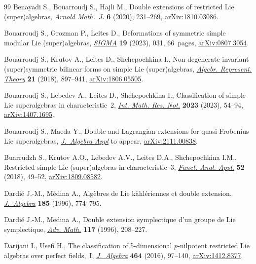 \documentclass[pdftex]{sigma}
\numberwithin{equation}{section}
\begin{document}
\begin{thebibliography}{99}
Benayadi S., Bouarroudj S., Hajli M., Double extensions of restricted {L}ie
 (super)algebras, \href{https://doi.org/10.1007/s40598-020-00149-5}{\textit{Arnold Math.~J.}} \textbf{6} (2020), 231--269,
 \href{https://arxiv.org/abs/1810.03086}{arXiv:1810.03086}.

Bouarroudj S., Grozman P., Leites D., Deformations of symmetric simple modular
 {L}ie (super)algebras, \href{https://doi.org/10.3842/SIGMA.2023.031}{\textit{SIGMA}} \textbf{19} (2023), 031, 66~pages,
 \href{https://arxiv.org/abs/0807.3054}{arXiv:0807.3054}.

Bouarroudj S., Krutov A., Leites D., Shchepochkina I., Non-degenerate invariant
 (super)symmetric bilinear forms on simple {L}ie (super)algebras,
 \href{https://doi.org/10.1007/s10468-018-9802-8}{\textit{Algebr. Represent. Theory}} \textbf{21} (2018), 897--941,
 \href{https://arxiv.org/abs/1806.05505}{arXiv:1806.05505}.

Bouarroudj S., Lebedev A., Leites D., Shchepochkina I., Classification of
 simple {L}ie superalgebras in characteristic~2, \href{https://doi.org/10.1093/imrn/rnab265}{\textit{Int. Math. Res. Not.}}
 \textbf{2023} (2023), 54--94, \href{https://arxiv.org/abs/1407.1695}{arXiv:1407.1695}.

Bouarroudj S., Maeda Y., Double and {L}agrangian extensions for
 quasi-{F}robenius {L}ie superalgebras, \href{https://doi.org/10.1142/S0219498824500014}{\textit{J.~Algebra Appl}} {t}o appear,
 \href{https://arxiv.org/abs/2111.00838}{arXiv:2111.00838}.

Buarrudzh S., Krutov A.O., Lebedev A.V., Leites D.A., Shchepochkina I.M.,
 Restricted simple {L}ie (super)algebras in characteristic~3, \href{https://doi.org/10.1007/s10688-018-0206-7}{\textit{Funct.
 Anal. Appl.}} \textbf{52} (2018), 49--52, \href{https://arxiv.org/abs/1809.08582}{arXiv:1809.08582}.

Dardi\'e J.-M., M\'edina A., Alg\`ebres de {L}ie k\"ahl\'eriennes et double
 extension, \href{https://doi.org/10.1006/jabr.1996.0350}{\textit{J.~Algebra}} \textbf{185} (1996), 774--795.

Dardi\'e J.-M., Medina A., Double extension symplectique d'un groupe de {L}ie
 symplectique, \href{https://doi.org/10.1006/aima.1996.0009}{\textit{Adv. Math.}} \textbf{117} (1996), 208--227.

Darijani I., Usefi H., The classification of 5-dimensional {$p$}-nilpotent
 restricted {L}ie algebras over perfect fields,~{I}, \href{https://doi.org/10.1016/j.jalgebra.2016.06.011}{\textit{J.~Algebra}}
 \textbf{464} (2016), 97--140, \href{https://arxiv.org/abs/1412.8377}{arXiv:1412.8377}.


\end{thebibliography}
\end{document}
